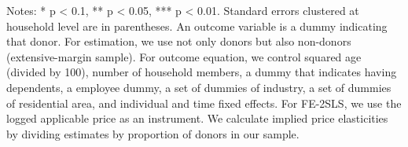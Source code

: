 \begin{table}
\begin{threeparttable}
\begin{tablenotes}
\item Notes: * p < 0.1, ** p < 0.05, *** p < 0.01. Standard errors clustered at household level are in parentheses. An outcome variable is a dummy indicating that donor. For estimation, we use not only donors but also non-donors (extensive-margin sample). For outcome equation, we control squared age (divided by 100), number of household members, a dummy that indicates having dependents, a employee dummy, a set of dummies of industry, a set of dummies of residential area, and individual and time fixed effects. For FE-2SLS, we use the logged applicable price as an instrument. We calculate implied price elasticities by dividing estimates by proportion of donors in our sample.
\end{tablenotes}
\end{threeparttable}
\end{table}
